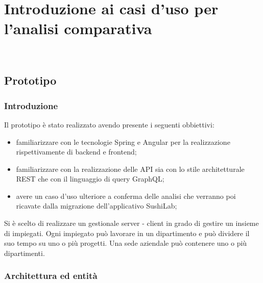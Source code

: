
\chapter{Introduzione ai casi d'uso per l'analisi comparativa}
\label{cap:casi-uso}

\\
\section{Prototipo}
\subsection{Introduzione}
Il prototipo è stato realizzato avendo presente i seguenti obbiettivi:
\begin{itemize}
  \item familiarizzare con le tecnologie Spring e Angular per la realizzazione rispettivamente di backend e frontend;
  \item familiarizzare con la realizzazione delle API sia con lo stile architetturale REST che con il linguaggio di query GraphQL;
  \item avere un caso d'uso ulteriore a conferma delle analisi che verranno poi ricavate dalla migrazione dell'applicativo SushiLab;
\end{itemize}
Si è scelto di realizzare un gestionale server - client in grado di gestire un insieme di impiegati. Ogni impiegato può lavorare in un dipartimento e può dividere il suo tempo su uno o più progetti. Una sede aziendale può contenere uno o più dipartimenti.
\subsection{Architettura ed entità}
